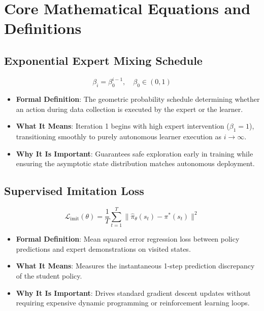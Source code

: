 \documentclass[11pt,a4paper]{article}
\theoremstyle{definition}
\begin{document}
\section{Core Mathematical Equations and Definitions}

\subsection{Exponential Expert Mixing Schedule}
{\boldmath
\begin{equation}
\beta_i = \beta_0^{i-1}, \quad \beta_0 \in (0, 1)
\end{equation}
}
\begin{itemize}
    \item \textbf{Formal Definition}: The geometric probability schedule determining whether an action during data collection is executed by the expert or the learner.
    \item \textbf{What It Means}: Iteration 1 begins with high expert intervention ($\beta_1 = 1$), transitioning smoothly to purely autonomous learner execution as $i \to \infty$.
    \item \textbf{Why It Is Important}: Guarantees safe exploration early in training while ensuring the asymptotic state distribution matches autonomous deployment.
\end{itemize}

\subsection{Supervised Imitation Loss}
{\boldmath
\begin{equation}
\mathcal{L}_{\text{imit}}(\theta) = \frac{1}{T}\sum_{t=1}^T \|\hat{\pi}_\theta(s_t) - \pi^*(s_t)\|^2
\end{equation}
}
\begin{itemize}
    \item \textbf{Formal Definition}: Mean squared error regression loss between policy predictions and expert demonstrations on visited states.
    \item \textbf{What It Means}: Measures the instantaneous 1-step prediction discrepancy of the student policy.
    \item \textbf{Why It Is Important}: Drives standard gradient descent updates without requiring expensive dynamic programming or reinforcement learning loops.
\end{itemize}
\end{document}
